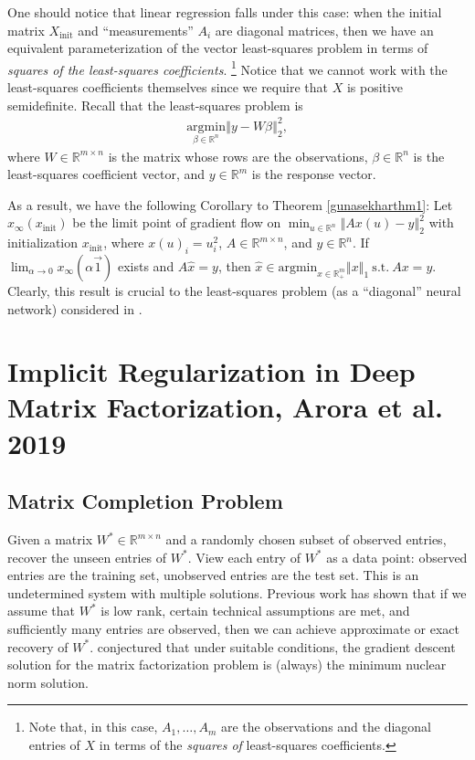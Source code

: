 \documentclass{article}
\newenvironment{manualcorollary}[1]{%
  \renewcommand\themanualcorollaryinner{#1}%
  \manualcorollaryinner
}{\endmanualcorollaryinner}
\begin{document}
One should notice that linear regression falls under this case: when the initial matrix $X_{\text{init}}$ and \enquote{measurements} $A_i$ are diagonal matrices, then we have an equivalent parameterization of the vector least-squares problem in terms of \textit{squares of the least-squares coefficients}. \footnote{Note that, in this case, $A_1, \ldots, A_m$ are the observations and the diagonal entries of $X$ in terms of the \textit{squares of} least-squares coefficients.} Notice that we cannot work with the least-squares coefficients themselves since we require that $X$ is positive semidefinite. Recall that the least-squares problem is 
\begin{align*}
  \underset{\beta \in \mathbb{R}^n}{\text{argmin}} \left\Vert y - W\beta \right\Vert_2^2,
\end{align*}
where $W \in \mathbb{R}^{m \times n}$ is the matrix whose rows are the observations, $\beta \in \mathbb{R}^n$ is the least-squares coefficient vector, and $y\in \mathbb{R}^m$ is the response vector.

As a result, we have the following Corollary to Theorem \ref{gunasekharthm1}:
\begin{manualcorollary}{2}\label{gunasekharcor2}
Let $x_{\infty}(x_{\text{init}})$ be the limit point of gradient flow on $\min_{u \in \mathbb{R}^n} \left\Vert A x(u) - y\right\Vert_2^2$ with initialization $x_{\text{init}}$, where $x(u)_i = u_i^2$, $A \in \mathbb{R}^{m \times n}$, and $y \in \mathbb{R}^n$. If $\lim_{\alpha \rightarrow 0}x_{\infty}(\alpha \vec{1})$ exists and $A\widehat{x}=y$, then
$\widehat{x} \in \text{argmin}_{x \in \mathbb{R}_+^m} \left\Vert x\right\Vert_1 \ \text{s.t.} \ Ax = y.$
\end{manualcorollary}
Clearly, this result is crucial to the least-squares problem (as a \enquote{diagonal} neural network) considered in \cite{woodworth2020kernel}.

\section{Implicit Regularization in Deep Matrix Factorization, Arora et al. 2019}
\subsection{Matrix Completion Problem}
Given a matrix $W^* \in \mathbb{R}^{m \times n}$ and a randomly chosen subset of observed entries, recover the unseen entries of $W^*$. View each entry of $W^*$ as a data point: observed entries are the training set, unobserved entries are the test set. This is an undetermined system with multiple solutions. Previous work has shown that if we assume that $W^*$ is low rank, certain technical assumptions are met, and sufficiently many entries are observed, then we can achieve approximate or exact recovery of $W^*$. \cite{gunasekar2018implicit} conjectured that under suitable conditions, the gradient descent solution for the matrix factorization problem is (always) the minimum nuclear norm solution.
\end{document}
